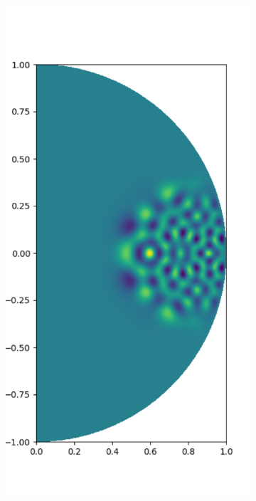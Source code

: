 \documentclass[11pt, oneside]{article}   	%
\begin{document}
\begin{figure}[t]
	\begin{subfigure}{0.3\textwidth}
	\centering
	\includegraphics[scale=0.3]{solution-helmholtz-k=100-n=1500}
	\end{subfigure}

\end{figure}
\end{document}
